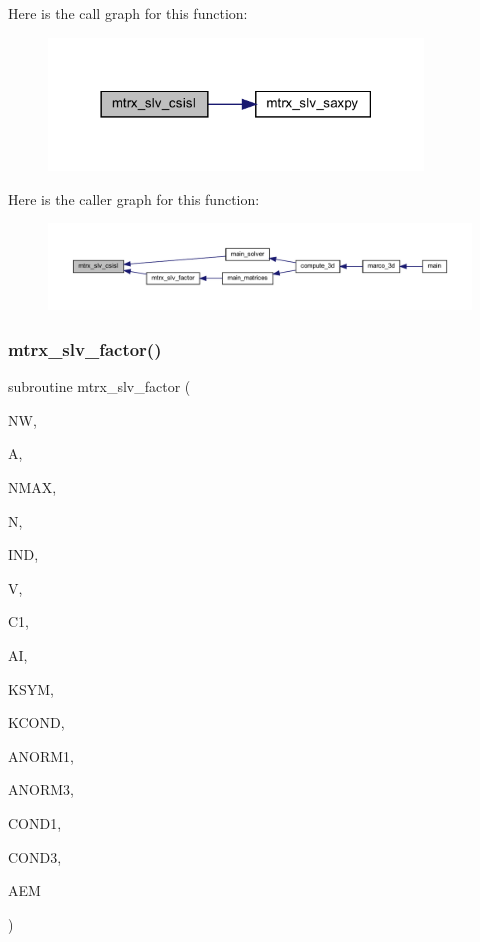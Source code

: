 Here is the call graph for this function\+:
\nopagebreak
\begin{figure}[H]
\begin{center}
\leavevmode
\includegraphics[width=282pt]{Marco_8f90_a0ecd03824aa01555ad345a3140e4286a_cgraph}
\end{center}
\end{figure}
Here is the caller graph for this function\+:
\nopagebreak
\begin{figure}[H]
\begin{center}
\leavevmode
\includegraphics[width=350pt]{Marco_8f90_a0ecd03824aa01555ad345a3140e4286a_icgraph}
\end{center}
\end{figure}
\mbox{\label{Marco_8f90_a09f928706f2018e58088d36d95fdfaba}} 
\subsubsection{\texorpdfstring{mtrx\+\_\+slv\+\_\+factor()}{mtrx\_slv\_factor()}}
{\footnotesize\ttfamily subroutine mtrx\+\_\+slv\+\_\+factor (\begin{DoxyParamCaption}\item[{integer}]{NW,  }\item[{complex, dimension(nmax,n)}]{A,  }\item[{integer}]{N\+M\+AX,  }\item[{integer}]{N,  }\item[{integer, dimension(n)}]{I\+ND,  }\item[{real, dimension(n)}]{V,  }\item[{complex, dimension(n)}]{C1,  }\item[{real, dimension(n)}]{AI,  }\item[{integer}]{K\+S\+YM,  }\item[{integer}]{K\+C\+O\+ND,  }\item[{real}]{A\+N\+O\+R\+M1,  }\item[{real}]{A\+N\+O\+R\+M3,  }\item[{real}]{C\+O\+N\+D1,  }\item[{real}]{C\+O\+N\+D3,  }\item[{real}]{A\+EM }\end{DoxyParamCaption})}

